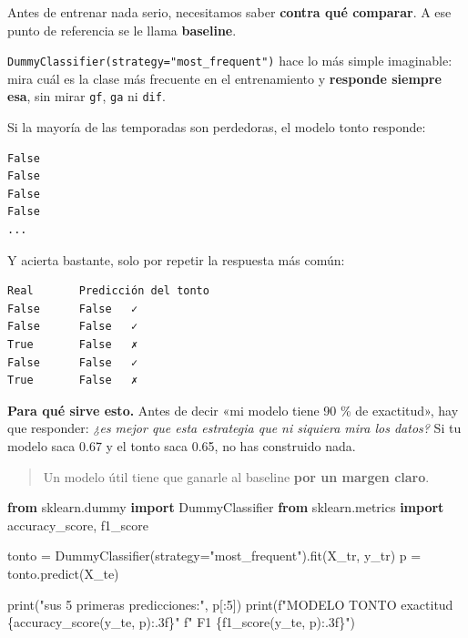 \documentclass[
]{article}
\newenvironment{Shaded}{}{}
\newcommand{\BuiltInTok}[1]{\textcolor[rgb]{0.00,0.50,0.00}{#1}}
\newcommand{\DecValTok}[1]{\textcolor[rgb]{0.25,0.63,0.44}{#1}}
\newcommand{\ImportTok}[1]{\textcolor[rgb]{0.00,0.50,0.00}{\textbf{#1}}}
\newcommand{\NormalTok}[1]{#1}
\newcommand{\OperatorTok}[1]{\textcolor[rgb]{0.40,0.40,0.40}{#1}}
\newcommand{\SpecialCharTok}[1]{\textcolor[rgb]{0.25,0.44,0.63}{#1}}
\newcommand{\SpecialStringTok}[1]{\textcolor[rgb]{0.73,0.40,0.53}{#1}}
\newcommand{\StringTok}[1]{\textcolor[rgb]{0.25,0.44,0.63}{#1}}
\begin{document}
Antes de entrenar nada serio, necesitamos saber \textbf{contra qué
comparar}. A ese punto de referencia se le llama \textbf{baseline}.

\texttt{DummyClassifier(strategy="most\_frequent")} hace lo más simple
imaginable: mira cuál es la clase más frecuente en el entrenamiento y
\textbf{responde siempre esa}, sin mirar \texttt{gf}, \texttt{ga} ni
\texttt{dif}.

Si la mayoría de las temporadas son perdedoras, el modelo tonto
responde:

\begin{verbatim}
False
False
False
False
...
\end{verbatim}

Y acierta bastante, solo por repetir la respuesta más común:

\begin{verbatim}
Real       Predicción del tonto
False      False   ✓
False      False   ✓
True       False   ✗
False      False   ✓
True       False   ✗
\end{verbatim}

\textbf{Para qué sirve esto.} Antes de decir «mi modelo tiene 90 \% de
exactitud», hay que responder: \emph{¿es mejor que esta estrategia que
ni siquiera mira los datos?} Si tu modelo saca 0.67 y el tonto saca
0.65, no has construido nada.

\begin{quote}
Un modelo útil tiene que ganarle al baseline \textbf{por un margen
claro}.
\end{quote}

\protect{}\label{i0ELhWl4nYyT}
\begin{Shaded}
\begin{Highlighting}[]
\ImportTok{from}\NormalTok{ sklearn.dummy }\ImportTok{import}\NormalTok{ DummyClassifier}
\ImportTok{from}\NormalTok{ sklearn.metrics }\ImportTok{import}\NormalTok{ accuracy\_score, f1\_score}

\NormalTok{tonto }\OperatorTok{=}\NormalTok{ DummyClassifier(strategy}\OperatorTok{=}\StringTok{"most\_frequent"}\NormalTok{).fit(X\_tr, y\_tr)}
\NormalTok{p }\OperatorTok{=}\NormalTok{ tonto.predict(X\_te)}

\BuiltInTok{print}\NormalTok{(}\StringTok{"sus 5 primeras predicciones:"}\NormalTok{, p[:}\DecValTok{5}\NormalTok{])}
\BuiltInTok{print}\NormalTok{(}\SpecialStringTok{f"MODELO TONTO   exactitud }\SpecialCharTok{\{}\NormalTok{accuracy\_score(y\_te, p)}\SpecialCharTok{:.3f\}}\SpecialStringTok{"}
      \SpecialStringTok{f"   F1 }\SpecialCharTok{\{}\NormalTok{f1\_score(y\_te, p)}\SpecialCharTok{:.3f\}}\SpecialStringTok{"}\NormalTok{)}
\end{Highlighting}
\end{Shaded}
\end{document}
